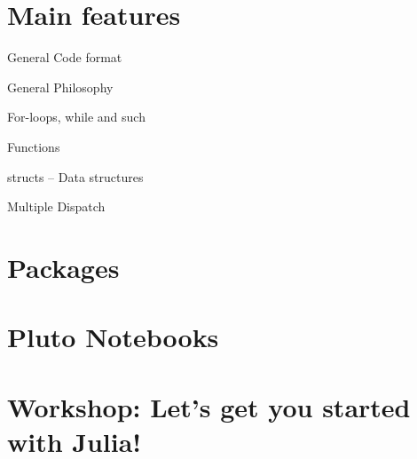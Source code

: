 \documentclass[aspectratio=169, handout]{beamer}
\begin{document}
    \section{Main features}
    \begin{frame}{General Code format}

    \end{frame}
    \begin{frame}{General Philosophy}

    \end{frame}
    \begin{frame}{For-loops, while and such}

    \end{frame}
    \begin{frame}{Functions}

    \end{frame}
    \begin{frame}{structs – Data structures}

    \end{frame}
    \begin{frame}{Multiple Dispatch}

    \end{frame}
    \section{Packages}
    \section{Pluto Notebooks}
    \section{Workshop: Let's get you started with Julia!}
\end{document}
